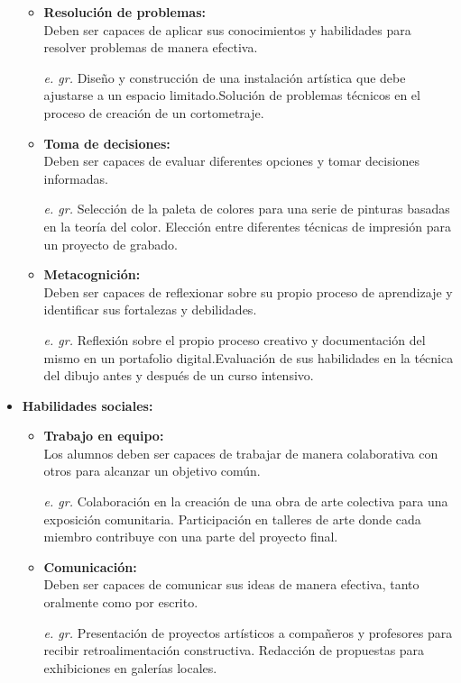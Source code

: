 \begin{itemize}
\begin{itemize}
        \item \textbf{Resolución de problemas:}\\
        Deben ser capaces de aplicar sus conocimientos y habilidades para resolver problemas de manera efectiva.
        \item[\textit{e. gr.}]Diseño y construcción de una instalación artística que debe ajustarse a un espacio limitado.Solución de problemas técnicos en el proceso de creación de un cortometraje.
        \item \textbf{Toma de decisiones:} \\
        Deben ser capaces de evaluar diferentes opciones y tomar decisiones informadas.
        \item[\textit{e. gr.}] Selección de la paleta de colores para una serie de pinturas basadas en la teoría del color. Elección entre diferentes técnicas de impresión para un proyecto de grabado.
        \item \textbf{Metacognición:}\\
        Deben ser capaces de reflexionar sobre su propio proceso de aprendizaje y identificar sus fortalezas y debilidades.
        \item[\textit{e. gr.}]
        Reflexión sobre el propio proceso creativo y documentación del mismo en un portafolio digital.Evaluación de sus habilidades en la técnica del dibujo antes y después de un curso intensivo.
    \end{itemize}
    \item \textbf{Habilidades sociales:}
    \begin{itemize}
        \item \textbf{Trabajo en equipo: }\\
        Los alumnos deben ser capaces de trabajar de manera colaborativa con otros para alcanzar un objetivo común.
       \item[\textit{e. gr.}] Colaboración en la creación de una obra de arte colectiva para una exposición comunitaria. Participación en talleres de arte donde cada miembro contribuye con una parte del proyecto final.
        \item \textbf{Comunicación: }\\
        Deben ser capaces de comunicar sus ideas de manera efectiva, tanto oralmente como por escrito.
        \item[\textit{e. gr.}]Presentación de proyectos artísticos a compañeros y profesores para recibir retroalimentación constructiva. Redacción de propuestas para exhibiciones en galerías locales.

\end{itemize}
\end{itemize}
